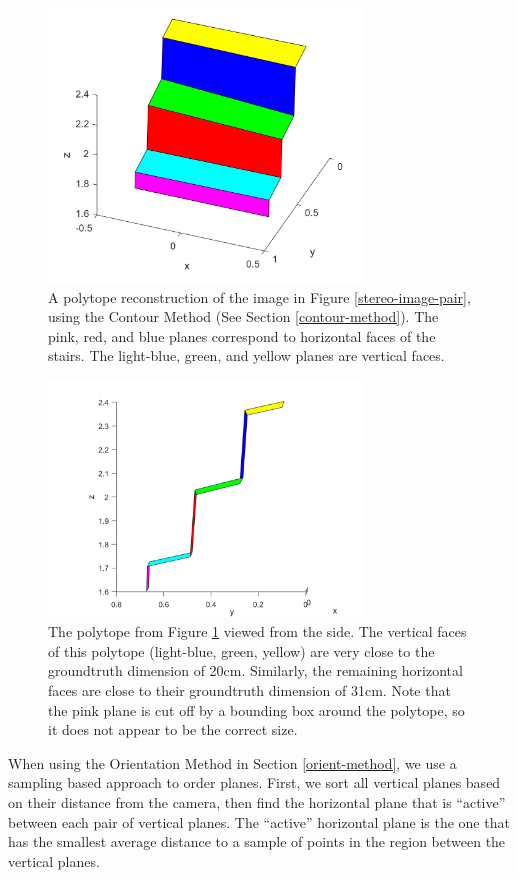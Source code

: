 \begin{figure}[!h]
\centering
\includegraphics[width=3.3in]{Sections/Figures/polytope_example.png}
\caption{A polytope reconstruction of the image in Figure \ref{stereo-image-pair}, using the Contour Method (See Section \ref{contour-method}). The pink, red, and blue planes correspond to horizontal faces of the stairs. The light-blue, green, and yellow planes are vertical faces.}
\label{polytope-diagonal-contour}
\end{figure}

\begin{figure}[!h]
\centering
\includegraphics[width=3.3in]{Sections/Figures/polytope_sideview.png}
\caption{The polytope from Figure \ref{polytope-diagonal-contour} viewed from the side. The vertical faces of this polytope (light-blue, green, yellow) are very close to the groundtruth dimension of 20cm. Similarly, the remaining horizontal faces are close to their groundtruth dimension of 31cm. Note that the pink plane is cut off by a bounding box around the polytope, so it does not appear to be the correct size.}
\label{polytope-sideview-contour}
\end{figure}

When using the Orientation Method in Section \ref{orient-method}, we use a sampling based approach to order planes. First, we sort all vertical planes based on their distance from the camera, then find the horizontal plane that is ``active'' between each pair of vertical planes. The ``active'' horizontal plane is the one that has the smallest average distance to a sample of points in the region between the vertical planes.



